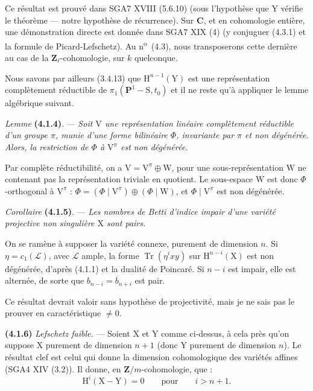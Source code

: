 \documentclass[11pt,leqno]{article}
\begin{document}
Ce résultat est prouvé dans SGA7 XVIII (5.6.10) (sous l’hypothèse que \(\mathrm{Y}\) vérifie le théorème — notre hypothèse de récurrence). Sur \(\mathbf{C}\), et en cohomologie entière, une démonstration directe est donnée dans SGA7 XIX (4) (y conjuguer (4.3.1) et la formule de Picard-Lefschetz). Au n\textsuperscript{o}~(4.3), nous transposerons cette dernière au cas de la \(\mathbf{Z}_\ell\)-cohomologie, sur \(k\) quelconque.

Nous savons par ailleurs (3.4.13) que \(\mathrm{H}^{n-1}(\mathrm{Y})\) est une représentation complètement réductible de \(\pi_1(\mathbf{P}^1-\mathrm{S},t_0)\) et il ne reste qu’à appliquer le lemme algébrique suivant.

\textit{Lemme} \textbf{(4.1.4)}. — \textit{Soit \(\mathrm{V}\) une représentation linéaire complètement réductible d’un groupe \(\pi\), munie d’une forme bilinéaire \(\Phi\), invariante par \(\pi\) et non dégénérée. Alors, la restriction de \(\Phi\) à \(\mathrm{V}^{\pi}\) est non dégénérée.}

Par complète réductibilité, on a \(\mathrm{V}=\mathrm{V}^{\pi}\oplus\mathrm{W}\), pour une sous-représentation \(\mathrm{W}\) ne contenant pas la représentation triviale en quotient. Le sous-espace \(\mathrm{W}\) est donc \(\Phi\)-orthogonal à \(\mathrm{V}^{\pi}\) : \(\Phi=(\Phi\mid\mathrm{V}^{\pi})\oplus(\Phi\mid\mathrm{W})\), et \(\Phi\mid\mathrm{V}^{\pi}\) est non dégénérée.

\textit{Corollaire} \textbf{(4.1.5)}. — \textit{Les nombres de Betti d’indice impair d’une variété projective non singulière \(\mathrm{X}\) sont pairs.}

On se ramène à supposer la variété connexe, purement de dimension \(n\). Si \(\eta=c_1(\mathscr{L})\), avec \(\mathscr{L}\) ample, la forme \(\operatorname{Tr}(\eta^ixy)\) sur \(\mathrm{H}^{n-i}(\mathrm{X})\) est non dégénérée, d’après (4.1.1) et la dualité de Poincaré. Si \(n-i\) est impair, elle est alternée, de sorte que \(b_{n-i}=b_{n+i}\) est pair.

Ce résultat devrait valoir sans hypothèse de projectivité, mais je ne sais pas le prouver en caractéristique \(\neq0\).

\textbf{(4.1.6)} \textit{Lefschetz faible.} — Soient \(\mathrm{X}\) et \(\mathrm{Y}\) comme ci-dessus, à cela près qu’on suppose \(\mathrm{X}\) purement de dimension \(n+1\) (donc \(\mathrm{Y}\) purement de dimension \(n\)). Le résultat clef est celui qui donne la dimension cohomologique des variétés affines (SGA4 XIV (3.2)). Il donne, en \(\mathbf{Z}/m\)-cohomologie, que :
\[
\mathrm{H}^i(\mathrm{X}-\mathrm{Y})=0
\qquad\text{pour}\qquad i>n+1.
\]
\end{document}
